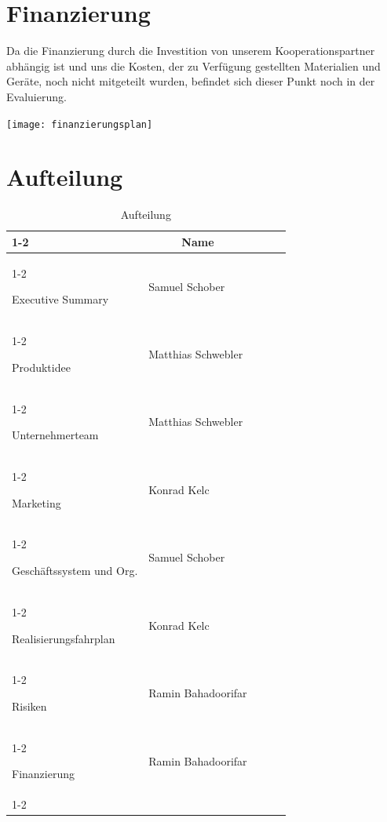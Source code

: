 \documentclass[11pt]{article}
\begin{document}
\section{Finanzierung}

Da die Finanzierung durch die Investition von unserem Kooperationspartner abhängig ist und uns die Kosten, der zu Verfügung gestellten Materialien und Geräte, noch nicht mitgeteilt wurden, befindet sich dieser Punkt noch in der Evaluierung.

\begin{minipage}{\textwidth}
	\centering
	\texttt{[image: finanzierungsplan]}
	\caption{}
	\label{fig:finanzierungsplan}
\end{minipage}
\newpage
\section{Aufteilung}
\begin{table}[ht]
	\centering
	\begin{tabular}{|l|l|lll}
		\cline{1-2}
		\multicolumn{1}{|c|}{\textbf{\rule{0pt}{3ex} Thema}} & \multicolumn{1}{c|}{\textbf{Name}} &  &  &  \\ \cline{1-2}

		\rule{0pt}{3ex} Executive Summary                    & Samuel Schober                     &  &  &  \\ \cline{1-2}
		\rule{0pt}{3ex} Produktidee                          & Matthias Schwebler                 &  &  &  \\ \cline{1-2}
		\rule{0pt}{3ex} Unternehmerteam                      & Matthias Schwebler                 &  &  &  \\ \cline{1-2}
		\rule{0pt}{3ex} Marketing                            & Konrad Kelc                        &  &  &  \\ \cline{1-2}
		\rule{0pt}{3ex} Gesch\"aftssystem und Org.           & Samuel Schober                     &  &  &  \\ \cline{1-2}
		\rule{0pt}{3ex} Realisierungsfahrplan                & Konrad Kelc                        &  &  &  \\ \cline{1-2}
		\rule{0pt}{3ex} Risiken                              & Ramin Bahadoorifar                 &  &  &  \\ \cline{1-2}
		\rule{0pt}{3ex} Finanzierung                         & Ramin Bahadoorifar                 &  &  &  \\ \cline{1-2}
	\end{tabular}
	\caption{Aufteilung}
\end{table}
\end{document}
